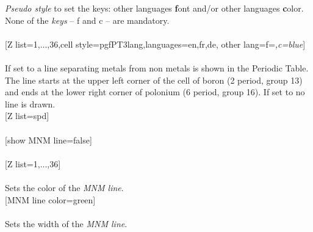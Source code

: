 \label{style_other lang}%
%
{\textit{Pseudo style} to set the keys: other languages \textbf{f}ont and/or other languages \textbf{c}olor. %
None of the \textit{keys} -- f and c -- are mandatory.
\\ [3pt]%
}%
\\ [5pt][Z list={1,...,36},cell style=pgfPT3lang,languages={en,fr,de}, other lang={f=\string\tiny\string\itshape,c=blue}]%
\\ [10pt]\makebox[\linewidth][c]{\scalebox{.6}{\pgfPT[Z list={1,...,36},cell style=pgfPT3lang,languages={en,fr,de}, other lang={f=\tiny\itshape,c=blue}]}}%
\\ [0pt]\pgfPTendstyle%
\label{option_show MNM line}%
%
{If set to  a line separating metals from non metals is shown in the Periodic Table. The line starts at the upper left corner of the cell of boron (2\raisebox{3.5pt}{\footnotesize nd} period, group 13) and ends at the lower right corner of polonium (6\raisebox{3.5pt}{\footnotesize th} period, group 16). If set to  no line is drawn.
}%
\\ [5pt][Z list=spd]%
\\ [10pt]\makebox[\linewidth][c]{\scalebox{.6}{\pgfPT[Z list=spd]}}%
\\ [10pt][show MNM line=false]%
\\ [10pt]\makebox[\linewidth][c]{\scalebox{.6}{\pgfPT[show MNM line=false]}}%
\\ [10pt][Z list={1,...,36}]%
\\ [10pt]\makebox[\linewidth][c]{\scalebox{.6}{\pgfPT[Z list={1,...,36}]}}%
\\ [0pt]\pgfPTendoption%
\label{option_MNM line color}%
%
{Sets the color of the \textit{MNM line}.}%
\\ [5pt][MNM line color=green]%
\\ [10pt]\makebox[\linewidth][c]{\scalebox{.6}{\pgfPT[MNM line color=green]}}%
\\ [0pt]\pgfPTendoption%
\label{option_MNM line width}%
%
{Sets the width of the \textit{MNM line}.}%
